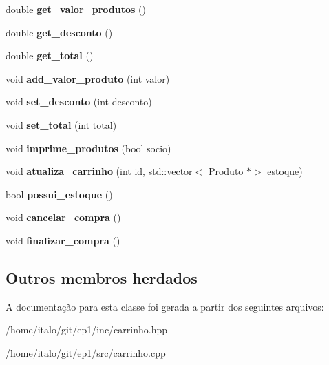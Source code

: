 \begin{DoxyCompactItemize}
\item 
\mbox{\label{class_carrinho_ab9191572529ba02cfc13366fbc80d7cc}} 
double {\bfseries get\+\_\+valor\+\_\+produtos} ()
\item 
\mbox{\label{class_carrinho_a1ffd510925552a0433155a20c98ab3bd}} 
double {\bfseries get\+\_\+desconto} ()
\item 
\mbox{\label{class_carrinho_ade44d088d0842ca044e3dcf0dcf6f3d3}} 
double {\bfseries get\+\_\+total} ()
\item 
\mbox{\label{class_carrinho_aba002453bd5e4bd36f3a25308c1f0d4d}} 
void {\bfseries add\+\_\+valor\+\_\+produto} (int valor)
\item 
\mbox{\label{class_carrinho_acea5cf443cba7cdf48e9b2019cbd0a28}} 
void {\bfseries set\+\_\+desconto} (int desconto)
\item 
\mbox{\label{class_carrinho_a1752b97a89f2c22c4cca9d140a74b56b}} 
void {\bfseries set\+\_\+total} (int total)
\item 
\mbox{\label{class_carrinho_aca1d82097c740cae4e0d1d9365cd0abc}} 
void {\bfseries imprime\+\_\+produtos} (bool socio)
\item 
\mbox{\label{class_carrinho_af7bb676480c12ac3d56ecd92a9eab00f}} 
void {\bfseries atualiza\+\_\+carrinho} (int id, std\+::vector$<$ \hyperlink{class_produto}{Produto} $\ast$$>$ estoque)
\item 
\mbox{\label{class_carrinho_a010e07131379a9f1445d889fce3df5e6}} 
bool {\bfseries possui\+\_\+estoque} ()
\item 
\mbox{\label{class_carrinho_a9458dccb325cf853cfa082eb930ae5b7}} 
void {\bfseries cancelar\+\_\+compra} ()
\item 
\mbox{\label{class_carrinho_a80238d9f88c542f136b89289f8602aab}} 
void {\bfseries finalizar\+\_\+compra} ()
\end{DoxyCompactItemize}
\subsection*{Outros membros herdados}


A documentação para esta classe foi gerada a partir dos seguintes arquivos\+:\begin{DoxyCompactItemize}
\item 
/home/italo/git/ep1/inc/carrinho.\+hpp\item 
/home/italo/git/ep1/src/carrinho.\+cpp\end{DoxyCompactItemize}
